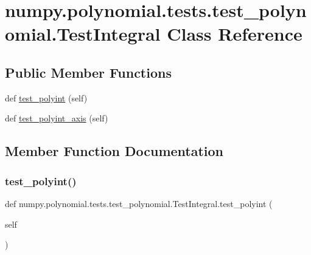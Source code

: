 \hypertarget{classnumpy_1_1polynomial_1_1tests_1_1test__polynomial_1_1TestIntegral}{}\section{numpy.\+polynomial.\+tests.\+test\+\_\+polynomial.\+Test\+Integral Class Reference}
\label{classnumpy_1_1polynomial_1_1tests_1_1test__polynomial_1_1TestIntegral}
\subsection*{Public Member Functions}
\begin{DoxyCompactItemize}
\item 
def \hyperlink{classnumpy_1_1polynomial_1_1tests_1_1test__polynomial_1_1TestIntegral_aa17914acfebc2e3869c708aab17d0ca5}{test\+\_\+polyint} (self)
\item 
def \hyperlink{classnumpy_1_1polynomial_1_1tests_1_1test__polynomial_1_1TestIntegral_abc5e39f8da6813e2db9a11188ef019d5}{test\+\_\+polyint\+\_\+axis} (self)
\end{DoxyCompactItemize}


\subsection{Member Function Documentation}
\mbox{\label{classnumpy_1_1polynomial_1_1tests_1_1test__polynomial_1_1TestIntegral_aa17914acfebc2e3869c708aab17d0ca5}} 
\subsubsection{\texorpdfstring{test\+\_\+polyint()}{test\_polyint()}}
{\footnotesize\ttfamily def numpy.\+polynomial.\+tests.\+test\+\_\+polynomial.\+Test\+Integral.\+test\+\_\+polyint (\begin{DoxyParamCaption}\item[{}]{self }\end{DoxyParamCaption})}

